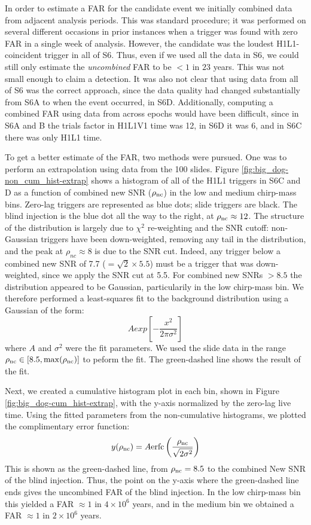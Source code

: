 In order to estimate a \ac{FAR} for the candidate event we initially combined
data from adjacent analysis periods. This was standard procedure; it was performed
on several different occasions in prior instances when a trigger was found with
zero \ac{FAR} in a single week of analysis. However, the candidate was the loudest
H1L1-coincident trigger in all of S6. Thus, even if we used all the data in S6, we could
still only estimate the \emph{uncombined} \ac{FAR} to be $< 1$ in $23$ years.
This was not small enough to claim a detection. It was also not clear that
using data from all of S6 was the correct approach, since the data quality had
changed substantially from S6A to when the event occurred, in S6D.
Additionally, computing a combined \ac{FAR} using data from across epochs would
have been difficult, since in S6A and B the trials factor in H1L1V1 time was
12, in S6D it was 6, and in S6C there was only H1L1 time. 

To get a better estimate of the \ac{FAR}, two methods were pursued. One was to
perform an extrapolation using data from the 100 slides. Figure
\ref{fig:big_dog-non_cum_hist-extrap} shows a histogram of all of the H1L1
triggers in S6C and D as a function of combined new \ac{SNR} ($\rho_{\mathrm{nc}}$) in
the low and medium chirp-mass bins. Zero-lag triggers are represented as blue
dots; slide triggers are black. The blind injection is the blue dot all the way
to the right, at $\rho_{\mathrm{nc}} \approx 12$. The structure of the distribution is
largely due to $\chi^2$ re-weighting and the \ac{SNR} cutoff: non-Gaussian
triggers have been down-weighted, removing any tail in the distribution, and
the peak at $\rho_{nc} \approx 8$ is due to the \ac{SNR} cut. Indeed, any
trigger below a combined new \ac{SNR} of 7.7 ($= \sqrt{2}\times 5.5$) must be a
trigger that was down-weighted, since we apply the \ac{SNR} cut at 5.5. For
combined new \acp{SNR} $> 8.5$ the distribution appeared to be Gaussian,
particularily in the low chirp-mass bin. We therefore performed a least-squares
fit to the background distribution using a Gaussian of the form:
\begin{equation*}
A exp\left[ -\frac{x^2}{2\pi\sigma^2} \right]
\end{equation*}
where $A$ and $\sigma^2$ were the fit parameters. We used the slide data in the
range $\rho_{\mathrm{nc}} \in [8.5, \max(\rho_{\mathrm{nc}})]$ to peform the fit. The green-dashed
line shows the result of the fit.

Next, we created a cumulative histogram plot in each bin, shown in Figure
\ref{fig:big_dog-cum_hist-extrap}, with the y-axis normalized by the zero-lag
live time. Using the fitted parameters from the non-cumulative histograms, we
plotted the complimentary error function:
\begin{equation*}
y(\rho_{\mathrm{nc}}) = A\mathrm{erfc}\left(\frac{\rho_{\mathrm{nc}}}{\sqrt{2\sigma^2}}\right)
\end{equation*}
This is shown as the green-dashed line, from $\rho_{\mathrm{nc}} = 8.5$ to the combined
New \ac{SNR} of the blind injection. Thus, the point on the y-axis where the
green-dashed line ends gives the uncombined \ac{FAR} of the blind injection. In
the low chirp-mass bin this yielded a \ac{FAR} $\approx 1$ in $4\times 10^{6}$
years, and in the medium bin we obtained a \ac{FAR} $\approx 1$ in $2\times
10^{6}$ years.

